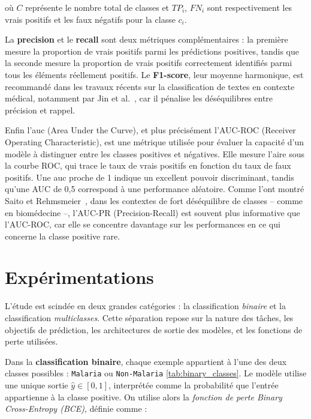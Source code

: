 \documentclass[12pt]{report}
\begin{document}
où \( C \) représente le nombre total de classes et \( TP_i \), \( FN_i \) sont respectivement les vrais positifs et les faux négatifs pour la classe \( c_i \).

La \textbf{precision} et le \textbf{recall} sont deux métriques complémentaires : la première mesure la proportion de vrais positifs parmi les prédictions positives, tandis que la seconde mesure la proportion de vrais positifs correctement identifiés parmi tous les éléments réellement positifs. Le \textbf{F1-score}, leur moyenne harmonique, est recommandé dans les travaux récents sur la classification de textes en contexte médical, notamment par Jin et al.~\cite{jin2019recurrent}, car il pénalise les déséquilibres entre précision et rappel. 

Enfin l'\gls{auc} (Area Under the Curve), et plus précisément l’AUC-ROC (Receiver Operating Characteristic), est une métrique utilisée pour évaluer la capacité d’un modèle à distinguer entre les classes positives et négatives. Elle mesure l’aire sous la courbe ROC, qui trace le taux de vrais positifs en fonction du taux de faux positifs. Une \gls{auc} proche de 1 indique un excellent pouvoir discriminant, tandis qu’une AUC de 0{,}5 correspond à une performance aléatoire. Comme l’ont montré Saito et Rehmsmeier~\cite{saito2015precision}, dans les contextes de fort déséquilibre de classes – comme en biomédecine –, l’AUC-PR (Precision-Recall) est souvent plus informative que l’AUC-ROC, car elle se concentre davantage sur les performances en ce qui concerne la classe positive rare.

\section{Expérimentations}

L’étude est scindée en deux grandes catégories : la classification \textit{binaire} et la classification \textit{multiclasses}. Cette séparation repose sur la nature des tâches, les objectifs de prédiction, les architectures de sortie des modèles, et les fonctions de perte utilisées.

Dans la \textbf{classification binaire}, chaque exemple appartient à l’une des deux classes possibles : \texttt{Malaria} ou \texttt{Non-Malaria} \autoref{tab:binary_classes}. Le modèle utilise une unique sortie $ \hat{y} \in [0,1] $, interprétée comme la probabilité que l’entrée appartienne à la classe positive. On utilise alors la \textit{fonction de perte Binary Cross-Entropy (BCE)}, définie comme :
\end{document}
